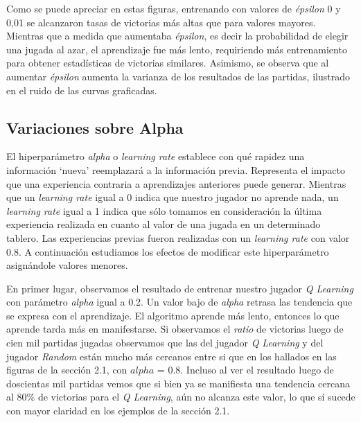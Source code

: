 \documentclass[10pt,a4paper]{article}
\begin{document}
Como se puede apreciar en estas figuras, entrenando con valores de \emph{épsilon} 0 y 0,01 se alcanzaron tasas de victorias más altas que para valores mayores. Mientras que a medida que aumentaba \emph{épsilon}, es decir la probabilidad de elegir una jugada al azar, el aprendizaje fue más lento, requiriendo más entrenamiento para obtener estadísticas de victorias similares. Asimismo, se observa que al aumentar \emph{épsilon} aumenta la varianza de los resultados de las partidas, ilustrado en el ruido de las curvas graficadas.

\subsection{Variaciones sobre Alpha}
El hiperparámetro \textit{alpha} o \textit{learning rate} establece con qué rapidez una información `nueva' reemplazará a la información previa. Representa el impacto que una experiencia contraria a aprendizajes anteriores puede generar. Mientras que un \textit{learning rate} igual a 0 indica que nuestro jugador no aprende nada, un \textit{learning rate} igual a 1 indica que sólo tomamos en consideración la última experiencia realizada en cuanto al valor de una jugada en un determinado tablero. Las experiencias previas fueron realizadas con un \textit{learning rate} con valor 0.8. A continuación estudiamos los efectos de modificar este hiperparámetro asignándole valores menores.

En primer lugar, observamos el resultado de entrenar nuestro jugador \textit{Q Learning} con parámetro \textit{alpha} igual a 0.2. Un valor bajo de \textit{alpha} retrasa las tendencia que se expresa con el aprendizaje. El algoritmo aprende más lento, entonces lo que aprende tarda más en manifestarse. Si observamos el \textit{ratio} de victorias luego de cien mil partidas jugadas observamos que las del jugador \textit{Q Learning} y del jugador \textit{Random} están mucho más cercanos entre si que en los hallados en las figuras de la sección 2.1, con $alpha$ = 0.8. Incluso al ver el resultado luego de doscientas mil partidas vemos que si bien ya se manifiesta una tendencia cercana al 80\% de victorias para el \textit{Q Learning}, aún no alcanza este valor, lo que sí sucede con mayor claridad en los ejemplos de la sección 2.1.
\end{document}
